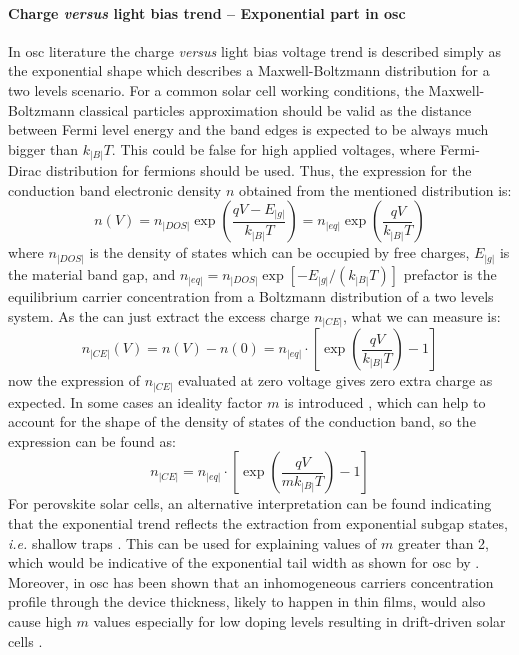 		\paragraph{Charge \textsl{versus} light bias trend -- Exponential part in \gls{osc}}\label{ce_exp_osc}
		In \gls{osc} literature the charge \textsl{versus} light bias voltage trend is described simply as the exponential shape which describes a Maxwell-Boltzmann distribution for a two levels scenario.
		For a common solar cell working conditions, the Maxwell-Boltzmann classical particles approximation should be valid as the distance between Fermi level energy and the band edges is expected to be always much bigger than $k_|B|T$.
		This could be false for high applied voltages, where Fermi-Dirac distribution for fermions should be used.
		Thus, the expression for the conduction band electronic density $n$ obtained from the mentioned distribution is:
		\begin{equation}
		n(V) = n_|DOS| \exp(\frac{qV - E_|g|}{k_|B|T}) = n_|eq| \exp(\frac{qV}{k_|B|T})
		\end{equation}
		where $n_|DOS|$ is the density of states which can be occupied by free charges, $E_|g|$ is the material band gap, and $n_|eq|=n_|DOS|\exp[-E_|g|/(k_|B|T)]$ prefactor is the equilibrium carrier concentration from a Boltzmann distribution of a two levels system. %
		As the  can just extract the excess charge $n_|CE|$, what we can measure is:
		\begin{equation}
		n_|CE|(V) = n(V)-n(0) = n_|eq| \cdot \left[\exp(\frac{qV}{k_|B|T})-1\right]
		\end{equation}
		now the expression of $n_|CE|$ evaluated at zero voltage gives zero extra charge as expected.
		In some cases an ideality factor $m$ is introduced \cite{Kirchartz2012}, which can help to account for the shape of the density of states of the conduction band, so the expression can be found as:
		\begin{equation}\label{eq:ce_osc}
			n_|CE| = n_|eq| \cdot \left[\exp(\frac{qV}{mk_|B|T})-1\right]
		\end{equation}
		For perovskite solar cells, an alternative interpretation can be found indicating that the exponential trend reflects the extraction from exponential subgap states, \textsl{i.e.} shallow traps \cite{Du2018}.
		This can be used for explaining values of $m$ greater than 2, which would be indicative of the exponential tail width as shown for \gls{osc} by .
		Moreover, in \gls{osc} has been shown that an inhomogeneous carriers concentration profile through the device thickness, likely to happen in thin films, would also cause high $m$ values \cite{Kirchartz2012} especially for low doping levels resulting in drift-driven solar cells \cite{Deledalle2015,Deledalle2014}.
		
